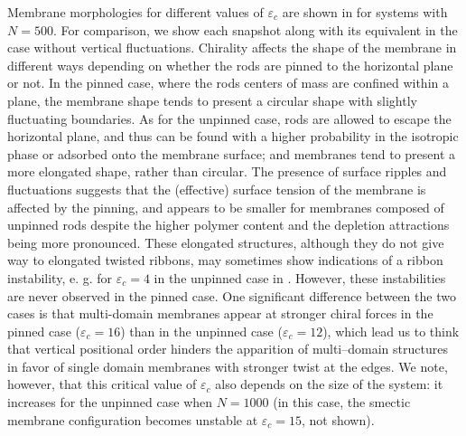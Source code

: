 Membrane morphologies for different values of $\varepsilon_c$ are shown in  for systems with $N=500$. For comparison, we show each snapshot along with its equivalent in the case without vertical fluctuations. Chirality affects the shape of the membrane in different ways depending on whether the rods are pinned to the horizontal plane or not. In the pinned case, where the rods centers of mass are confined within a plane, the membrane shape tends to present a circular shape with slightly fluctuating boundaries. As for the unpinned case, rods are allowed to escape the horizontal plane, and thus can be found with a higher probability in the isotropic phase or adsorbed onto the membrane surface; and membranes tend to present a more elongated shape, rather than circular. The presence of surface ripples and fluctuations suggests that the (effective) surface tension of the membrane is affected by the pinning, and appears to be smaller for membranes composed of unpinned rods despite the  higher polymer content and the depletion attractions being more pronounced.  These elongated structures, although they do not give way to elongated twisted ribbons, may sometimes show indications of a ribbon instability, e. g. for $\varepsilon_c=4$ in the unpinned case in . However, these instabilities are never observed in the pinned case. One significant difference between the two cases is that multi-domain membranes appear at stronger chiral forces in the pinned case ($\varepsilon_c=16$) than in the unpinned case ($\varepsilon_c=12$), which lead us to think that vertical positional order hinders the apparition of multi--domain structures in favor of single domain membranes with stronger twist at the edges. We note, however, that this critical value of $\varepsilon_c$ also depends on the size of the system: it increases for the unpinned case when $N=1000$ (in this case, the smectic membrane configuration becomes unstable at $\varepsilon_c=15$, not shown).

